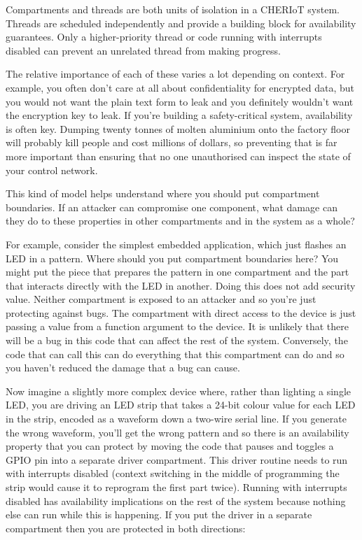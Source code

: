 \begin{note}
Compartments and threads are both units of isolation in a CHERIoT system.
Threads are scheduled independently and provide a building block for availability guarantees.
Only a higher-priority thread or code running with interrupts disabled can prevent an unrelated thread from making progress.
\end{note}

The relative importance of each of these varies a lot depending on context.
For example, you often don't care at all about confidentiality for encrypted data, but you would not want the plain text form to leak and you definitely wouldn't want the encryption key to leak.
If you're building a safety-critical system, availability is often key.
Dumping twenty tonnes of molten aluminium onto the factory floor will probably kill people and cost millions of dollars, so preventing that is far more important than ensuring that no one unauthorised can inspect the state of your control network.

This kind of model helps understand where you should put compartment boundaries.
If an attacker can compromise one component, what damage can they do to these properties in other compartments and in the system as a whole?

For example, consider the simplest embedded application, which just flashes an LED in a pattern.
Where should you put compartment boundaries here?
You might put the piece that prepares the pattern in one compartment and the part that interacts directly with the LED in another.
Doing this does not add security value.
Neither compartment is exposed to an attacker and so you're just protecting against bugs.
The compartment with direct access to the device is just passing a value from a function argument to the device.
It is unlikely that there will be a bug in this code that can affect the rest of the system.
Conversely, the code that can call this can do everything that this compartment can do and so you haven't reduced the damage that a bug can cause.

Now imagine a slightly more complex device where, rather than lighting a single LED, you are driving an LED strip that takes a 24-bit colour value for each LED in the strip, encoded as a waveform down a two-wire serial line.
If you generate the wrong waveform, you'll get the wrong pattern and so there is an availability property that you can protect by moving the code that pauses and toggles a GPIO pin into a separate driver compartment.
This driver routine needs to run with interrupts disabled (context switching in the middle of programming the strip would cause it to reprogram the first part twice).
Running with interrupts disabled has availability implications on the rest of the system because nothing else can run while this is happening.
If you put the driver in a separate compartment then you are protected in both directions:

